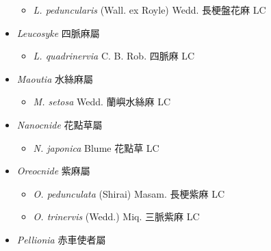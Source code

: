 \begin{itemize}
  \begin{itemize}
        \item[] \textit{L. peduncularis} (Wall. ex Royle) Wedd.  長梗盤花麻   LC
  \end{itemize}
 \item[] \textit{Leucosyke} 四脈麻屬
                                
  \begin{itemize}
        \item[] \textit{L. quadrinervia} C. B. Rob.  四脈麻   LC
  \end{itemize}
 \item[] \textit{Maoutia} 水絲麻屬
                                
  \begin{itemize}
        \item[] \textit{M. setosa} Wedd.  蘭嶼水絲麻   LC
  \end{itemize}
 \item[] \textit{Nanocnide} 花點草屬
                                
  \begin{itemize}
        \item[] \textit{N. japonica} Blume  花點草   LC
  \end{itemize}
 \item[] \textit{Oreocnide} 紫麻屬
                                
  \begin{itemize}
        \item[] \textit{O. pedunculata} (Shirai) Masam.  長梗紫麻   LC
        \item[] \textit{O. trinervis} (Wedd.) Miq.  三脈紫麻   LC
  \end{itemize}
 \item[] \textit{Pellionia} 赤車使者屬
                                

\end{itemize}
